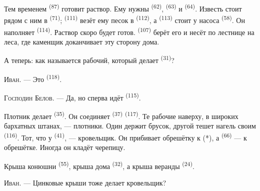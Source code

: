 Тем временем  \textsuperscript{(87)} готовит раствор. Ему
нужны  \textsuperscript{(62)},  \textsuperscript{(63)} и
 \textsuperscript{(64)}. Известь стоит рядом с ним в 
\textsuperscript{(71)};  \textsuperscript{(111)} везёт ему
песок в  \textsuperscript{(112)}, а  \textsuperscript{(113)}
стоит у насоса \textsuperscript{(58)}. Он наполняет 
\textsuperscript{(114)}. Раствор скоро будет готов. 
\textsuperscript{(107)} берёт его и несёт по лестнице на леса, где каменщик
доканчивает эту сторону дома.

А теперь: как называется рабочий, который делает 
\textsuperscript{(31)}?

\textsc{Иван}. --- Это  \textsuperscript{(118)}.

\VUsaut{3.0mm}
\VUsaut{3.0mm}

\textsc{Господин Белов}. --- Да, но сперва идёт 
\textsuperscript{(115)}.

Плотник делает  \textsuperscript{(35)}. Он соединяет
 \textsuperscript{(37)}  \textsuperscript{(117)}. Те
рабочие наверху, в широких бархатных штанах, --- плотники. Один держит
брусок, другой тешет нагель своим  \textsuperscript{(116)}. Тот,
что у  \textsuperscript{(41)}, --- кровельщик. Он прибивает обрешётку
к  (*), а  \textsuperscript{(66)} --- к обрешётке.
Иногда он кладёт черепицу.


Крыша конюшни  \textsuperscript{(55)}, крыша дома
 \textsuperscript{(32)}, а крыша веранды 
\textsuperscript{(24)}.

\textsc{Иван}. --- Цинковые крыши тоже делает кровельщик?

